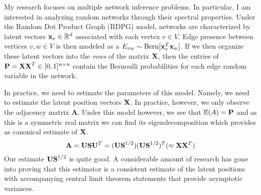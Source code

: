 \documentclass[12pt]{article}
\begin{document}
My research focuses on multiple network inference problems. In particular, I am interested in analyzing random networks through their spectral properties. Under the Random Dot Product Graph (RDPG) model, networks are characterized by latent vectors $\mathbf{x}_v\in\mathbb{R}^{d}$ associated with each vertex $v\in V$. Edge presence between vertices $v,w\in V$ is then modeled as a $E_{vw}\sim\text{Bern}[\mathbf{x}_v^T\mathbf{x}_w]$. If we then organize these latent vectors into the \textit{rows} of the matrix $\mathbf{X}$, then the entries of $\mathbf{P} = \mathbf{XX}^T\in[0,1]^{n\times n}$ contain the Bernoulli probabilities for each edge random variable in the network.

In practice, we need to estimate the parameters of this model. Namely, we need to estimate the latent position vectors $\mathbf{X}$. In practice, however, we only observe the adjacency matrix $\mathbf{A}$. Under this model however, we see that ${\mathbb{E}}(A) = \mathbf{P}$ and as this is a symmetric real matrix we can find its eigendecomposition which provides as canonical estimate of $\mathbf{X}$. 
\begin{equation}
    \mathbf{A} = \mathbf{USU}^T = (\mathbf{US}^{1/2})(\mathbf{US}^{1/2})^T (\approx \mathbf{XX}^T)  
\end{equation}
Our estimate $\mathbf{US}^{1/2}$ is quite good. A considerable amount of research has gone into proving that this estimator is a consistent estimate of the latent positions with accompanying central limit theorem statements that provide asymptotic variances. 
\end{document}
